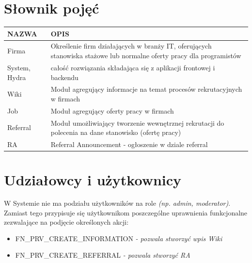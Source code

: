 \documentclass[oneside]{scrreprt}
\begin{document}
\section{Słownik pojęć}
\begin{table}[ht]
	\centering
	\begin{tabular}{p{4cm}p{8cm}}
		\textbf{NAZWA}                     & \textbf{OPIS}                                                                                                       \\ \hline
		\multicolumn{1}{l|}{Firma}         & Określenie firm działających w branży IT, oferujących stanowiska stażowe lub normalne oferty pracy dla programistów \\ \hline
		\multicolumn{1}{l|}{System, Hydra} & całość rozwiązania składająca się z aplikacji frontowej i backendu                                                  \\ \hline
		\multicolumn{1}{l|}{Wiki}          & Moduł agregujący informacje na temat procesów rekrutacyjnych w firmach                                              \\ \hline
		\multicolumn{1}{l|}{Job}           & Moduł agregujący oferty pracy w firmach                                                                             \\ \hline
		\multicolumn{1}{l|}{Referral}      & Moduł umożliwiający tworzenie wewnętrznej rekrutacji do polecenia na dane stanowisko (ofertę pracy)                 \\ \hline
		\multicolumn{1}{l|}{RA}            & Referral Announcement - ogłoszenie w dziale referral                                                                \\ \hline
	\end{tabular}
\end{table}

\section{Udziałowcy i użytkownicy}
W Systemie nie ma podziału użytkowników na role \textit{(np. admin, moderator)}. 
Zamiast tego przypisuje się użytkownikom poszczególne uprawnienia funkcjonalne zezwalające na podjęcie określonych akcji:
\begin{itemize}
	\item FN\_PRV\_CREATE\_INFORMATION \textit{ - pozwala stworzyć wpis Wiki}
	\item FN\_PRV\_CREATE\_REFERRAL \textit{ - pozwala stworzyć RA}
\end{itemize}
\end{document}
